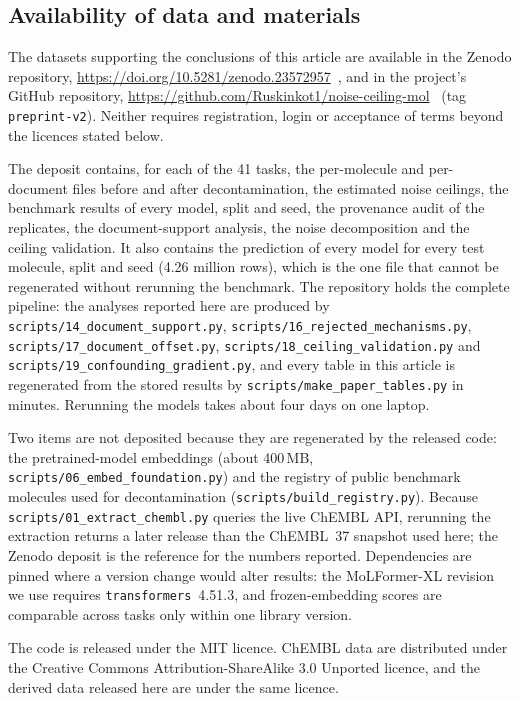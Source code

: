\subsection*{Availability of data and materials}
{\sloppy
The datasets supporting the conclusions of this article are available in the Zenodo repository, \url{https://doi.org/10.5281/zenodo.23572957}~\cite{lukin2026zenodo}, and in the project's GitHub repository, \url{https://github.com/Ruskinkot1/noise-ceiling-mol}~\cite{lukin2026repo} (tag \texttt{preprint-v2}). Neither requires registration, login or acceptance of terms beyond the licences stated below.

The deposit contains, for each of the 41 tasks, the per-molecule and per-document files before and after decontamination, the estimated noise ceilings, the benchmark results of every model, split and seed, the provenance audit of the replicates, the document-support analysis, the noise decomposition and the ceiling validation. It also contains the prediction of every model for every test molecule, split and seed (4.26 million rows), which is the one file that cannot be regenerated without rerunning the benchmark. The repository holds the complete pipeline: the analyses reported here are produced by \texttt{scripts/14\_document\_support.py}, \texttt{scripts/16\_rejected\_mechanisms.py}, \texttt{scripts/17\_document\_offset.py}, \texttt{scripts/18\_ceiling\_validation.py} and \texttt{scripts/19\_confounding\_gradient.py}, and every table in this article is regenerated from the stored results by \texttt{scripts/make\_paper\_tables.py} in minutes. Rerunning the models takes about four days on one laptop.

Two items are not deposited because they are regenerated by the released code: the pretrained-model embeddings (about 400\,MB, \texttt{scripts/06\_embed\_foundation.py}) and the registry of public benchmark molecules used for decontamination (\texttt{scripts/build\_registry.py}). Because \texttt{scripts/01\_extract\_chembl.py} queries the live ChEMBL API, rerunning the extraction returns a later release than the ChEMBL~37 snapshot used here; the Zenodo deposit is the reference for the numbers reported. Dependencies are pinned where a version change would alter results: the MoLFormer-XL revision we use requires \texttt{transformers}~4.51.3, and frozen-embedding scores are comparable across tasks only within one library version.

The code is released under the MIT licence. ChEMBL data are distributed under the Creative Commons Attribution-ShareAlike 3.0 Unported licence, and the derived data released here are under the same licence.
\par}

